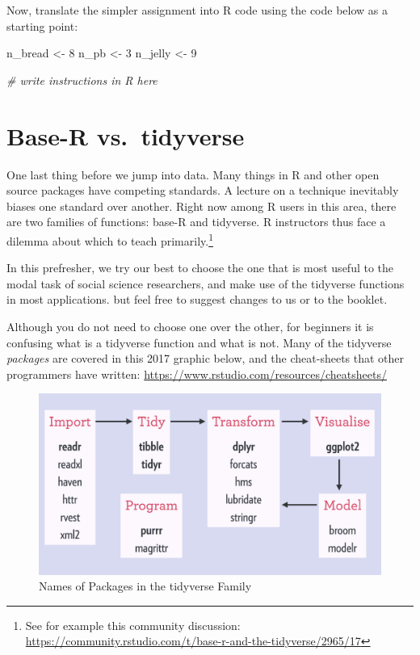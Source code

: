 \documentclass[]{book}
\newenvironment{Shaded}{\begin{snugshade}}{\end{snugshade}}
\newcommand{\CommentTok}[1]{\textcolor[rgb]{0.56,0.35,0.01}{\textit{#1}}}
\newcommand{\DecValTok}[1]{\textcolor[rgb]{0.00,0.00,0.81}{#1}}
\newcommand{\NormalTok}[1]{#1}
\newcommand{\StringTok}[1]{\textcolor[rgb]{0.31,0.60,0.02}{#1}}
\let\rmarkdownfootnote\footnote%
\def\footnote{\protect\rmarkdownfootnote}
\theoremstyle{definition}
\theoremstyle{definition}
\theoremstyle{definition}
\theoremstyle{remark}
\begin{document}
Now, translate the simpler assignment into R code using the code below as a starting point:

\begin{Shaded}
\begin{Highlighting}[]
\NormalTok{n_bread <-}\StringTok{ }\DecValTok{8}
\NormalTok{n_pb <-}\StringTok{ }\DecValTok{3}
\NormalTok{n_jelly <-}\StringTok{ }\DecValTok{9}

\CommentTok{# write instructions in R here}
\end{Highlighting}
\end{Shaded}

\hypertarget{base-r-vs.tidyverse}{%
\section{Base-R vs.~tidyverse}\label{base-r-vs.tidyverse}}

One last thing before we jump into data. Many things in R and other open source packages have competing standards. A lecture on a technique inevitably biases one standard over another. Right now among R users in this area, there are two families of functions: base-R and tidyverse. R instructors thus face a dilemma about which to teach primarily.\footnote{See for example this community discussion: \url{https://community.rstudio.com/t/base-r-and-the-tidyverse/2965/17}}

In this prefresher, we try our best to choose the one that is most useful to the modal task of social science researchers, and make use of the tidyverse functions in most applications. but feel free to suggest changes to us or to the booklet.

Although you do not need to choose one over the other, for beginners it is confusing what is a tidyverse function and what is not. Many of the tidyverse \emph{packages} are covered in this 2017 graphic below, and the cheat-sheets that other programmers have written: \url{https://www.rstudio.com/resources/cheatsheets/}

\begin{figure}
\centering
\includegraphics{images/tidyverse-packages.png}
\caption{Names of Packages in the tidyverse Family}
\end{figure}
\end{document}
